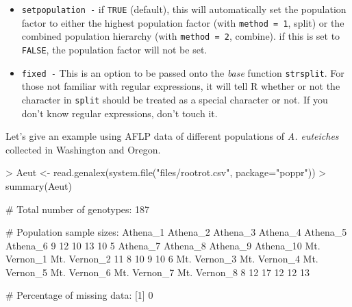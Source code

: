 \documentclass[letterpaper]{article}
\begin{document}
\begin{itemize}
  \item \texttt{setpopulation -} if \texttt{TRUE} (default), this will automatically set the population factor to either the highest population factor (with \texttt{method = 1}, split) or the combined population hierarchy (with \texttt{method = 2}, combine). if this is set to \texttt{FALSE}, the population factor will not be set.
  \item \texttt{fixed -} This is an option to be passed onto the \textit{base} function \texttt{strsplit}. For those not familiar with regular expressions, it will tell R whether or not the character in \texttt{split} should be treated as a special character or not. If you don't know regular expressions, don't touch it.
\end{itemize}

Let's give an example using AFLP data of different populations of \textit{A. euteiches} collected in Washington and Oregon. \cite{Grunwald:2006}
\begin{Schunk}
\begin{Sinput}
> Aeut <- read.genalex(system.file("files/rootrot.csv", package="poppr"))
> summary(Aeut)
\end{Sinput}
\begin{Soutput}
 # Total number of genotypes:  187 

 # Population sample sizes:  
    Athena_1     Athena_2     Athena_3     Athena_4     Athena_5     Athena_6 
           9           12           10           13           10            5 
    Athena_7     Athena_8     Athena_9    Athena_10 Mt. Vernon_1 Mt. Vernon_2 
          11            8           10            9           10            6 
Mt. Vernon_3 Mt. Vernon_4 Mt. Vernon_5 Mt. Vernon_6 Mt. Vernon_7 Mt. Vernon_8 
           8           12           17           12           12           13 

 # Percentage of missing data:  
[1] 0
\end{Soutput}
\end{Schunk}
\begin{center}
\end{center}
\end{document}
